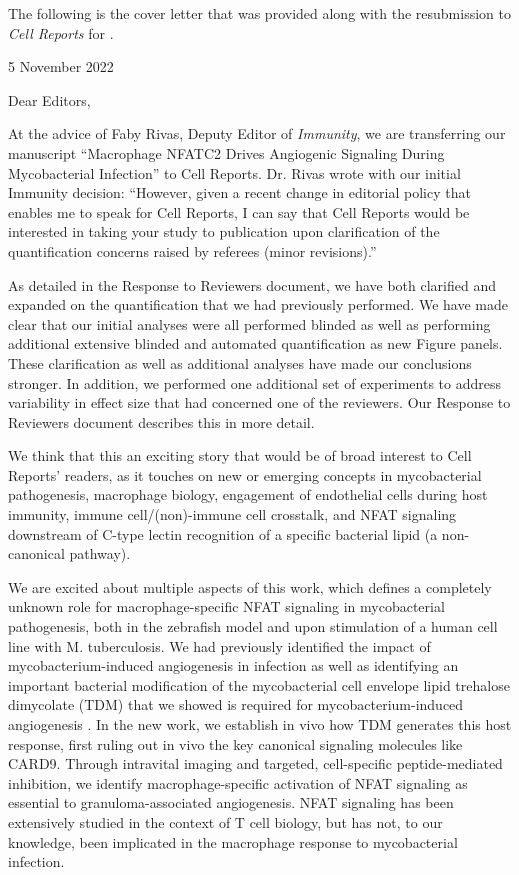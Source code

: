The following is the cover letter that was provided along with the resubmission to \textit{Cell Reports} for \citet{Brewer2022}.

\begin{flushright}
5 November 2022
\end{flushright}

Dear Editors,

At the advice of Faby Rivas, Deputy Editor of \textit{Immunity}, we are transferring our manuscript “Macrophage NFATC2 Drives Angiogenic Signaling During Mycobacterial Infection” to Cell Reports. Dr. Rivas wrote with our initial Immunity decision: ``However, given a recent change in editorial policy that enables me to speak for Cell Reports, I can say that Cell Reports would be interested in taking your study to publication upon clarification of the quantification concerns raised by referees (minor revisions).''

As detailed in the Response to Reviewers document, we have both clarified and expanded on the quantification that we had previously performed. We have made clear that our initial analyses were all performed blinded as well as performing additional extensive blinded and automated quantification as new Figure panels. These clarification as well as additional analyses have made our conclusions stronger. In addition, we performed one additional set of experiments to address variability in effect size that had concerned one of the reviewers. Our Response to Reviewers document describes this in more detail.

We think that this an exciting story that would be of broad interest to Cell Reports’ readers, as it touches on new or emerging concepts in mycobacterial pathogenesis, macrophage biology, engagement of endothelial cells during host immunity, immune cell/(non)-immune cell crosstalk, and NFAT signaling downstream of C-type lectin recognition of a specific bacterial lipid (a non-canonical pathway).

We are excited about multiple aspects of this work, which defines a completely unknown role for macrophage-specific NFAT signaling in mycobacterial pathogenesis, both in the zebrafish model and upon stimulation of a human cell line with M. tuberculosis. We had previously identified the impact of mycobacterium-induced angiogenesis in infection \citep{Oehlers2015} as well as identifying an important bacterial modification of the mycobacterial cell envelope lipid trehalose dimycolate (TDM) that we showed is required for mycobacterium-induced angiogenesis \citep{Walton2018}. In the new work, we establish in vivo how TDM generates this host response, first ruling out in vivo the key canonical signaling molecules like CARD9. Through intravital imaging and targeted, cell-specific peptide-mediated inhibition, we identify macrophage-specific activation of NFAT signaling as essential to granuloma-associated angiogenesis. NFAT signaling has been extensively studied in the context of T cell biology, but has not, to our knowledge, been implicated in the macrophage response to mycobacterial infection.

